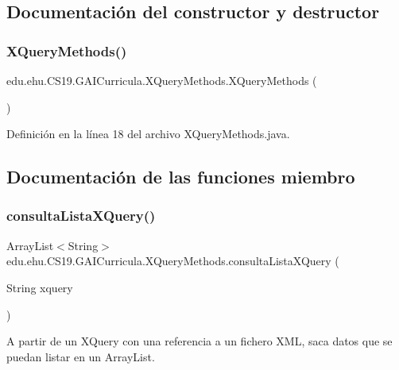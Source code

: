 \subsection{Documentación del constructor y destructor}
\mbox{\label{a00032_ade5a845ccb94c1feb5420a2550243985}} 
\subsubsection{\texorpdfstring{XQueryMethods()}{XQueryMethods()}}
{\footnotesize\ttfamily edu.\+ehu.\+C\+S19.\+G\+A\+I\+Curricula.\+X\+Query\+Methods.\+X\+Query\+Methods (\begin{DoxyParamCaption}{ }\end{DoxyParamCaption})}



Definición en la línea 18 del archivo X\+Query\+Methods.\+java.



\subsection{Documentación de las funciones miembro}
\mbox{\label{a00032_a8b0ac4baf3bbd3829073a87325dd714d}} 
\subsubsection{\texorpdfstring{consultaListaXQuery()}{consultaListaXQuery()}}
{\footnotesize\ttfamily Array\+List$<$String$>$ edu.\+ehu.\+C\+S19.\+G\+A\+I\+Curricula.\+X\+Query\+Methods.\+consulta\+Lista\+X\+Query (\begin{DoxyParamCaption}\item[{String}]{xquery }\end{DoxyParamCaption})}



A partir de un X\+Query con una referencia a un fichero X\+ML, saca datos que se puedan listar en un Array\+List. 


